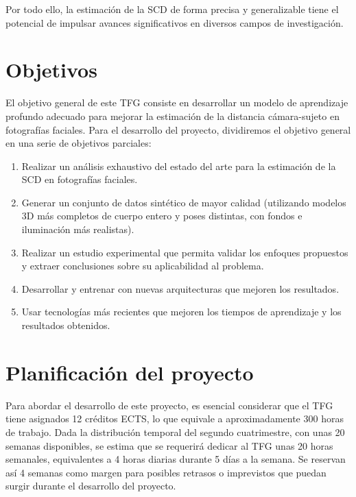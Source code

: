 Por todo ello, la estimación de la SCD de forma precisa y generalizable tiene el potencial de impulsar avances significativos en diversos campos de investigación.


\section{Objetivos}
 El objetivo general de este TFG consiste en desarrollar un modelo de aprendizaje profundo adecuado para mejorar la estimación de la distancia cámara-sujeto en fotografías faciales. Para el desarrollo del proyecto, dividiremos el objetivo general en una serie de objetivos parciales:
\begin{enumerate}
    \item Realizar un análisis exhaustivo del estado del arte para la estimación de la SCD en fotografías faciales.
    \item Generar un conjunto de datos sintético de mayor calidad (utilizando modelos 3D más completos de cuerpo entero y poses distintas, con fondos e iluminación más realistas).
    \item Realizar un estudio experimental que permita validar los enfoques propuestos y extraer conclusiones sobre su aplicabilidad al problema.
    \item Desarrollar y entrenar con nuevas arquitecturas que mejoren los resultados.
    \item Usar tecnologías más recientes que mejoren los tiempos de aprendizaje y los resultados obtenidos.
\end{enumerate}

\section{Planificación del proyecto}

Para abordar el desarrollo de este proyecto, es esencial considerar que el TFG tiene asignados 12 créditos ECTS, lo que equivale a aproximadamente 300 horas de trabajo. Dada la distribución temporal del segundo cuatrimestre, con unas 20 semanas disponibles, se estima que se requerirá dedicar al TFG unas 20 horas semanales, equivalentes a 4 horas diarias durante 5 días a la semana. Se reservan así 4 semanas como margen para posibles retrasos o imprevistos que puedan surgir durante el desarrollo del proyecto.

